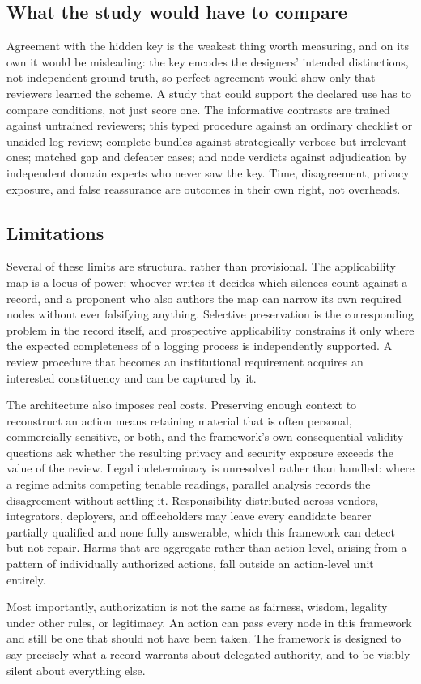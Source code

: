 \subsection{What the study would have to compare}

Agreement with the hidden key is the weakest thing worth measuring, and on its own it would be misleading: the key encodes the designers' intended distinctions, not independent ground truth, so perfect agreement would show only that reviewers learned the scheme. A study that could support the declared use has to compare conditions, not just score one. The informative contrasts are trained against untrained reviewers; this typed procedure against an ordinary checklist or unaided log review; complete bundles against strategically verbose but irrelevant ones; matched gap and defeater cases; and node verdicts against adjudication by independent domain experts who never saw the key. Time, disagreement, privacy exposure, and false reassurance are outcomes in their own right, not overheads.

\subsection{Limitations}

Several of these limits are structural rather than provisional. The applicability map is a locus of power: whoever writes it decides which silences count against a record, and a proponent who also authors the map can narrow its own required nodes without ever falsifying anything. Selective preservation is the corresponding problem in the record itself, and prospective applicability constrains it only where the expected completeness of a logging process is independently supported. A review procedure that becomes an institutional requirement acquires an interested constituency and can be captured by it.

The architecture also imposes real costs. Preserving enough context to reconstruct an action means retaining material that is often personal, commercially sensitive, or both, and the framework's own consequential-validity questions ask whether the resulting privacy and security exposure exceeds the value of the review. Legal indeterminacy is unresolved rather than handled: where a regime admits competing tenable readings, parallel analysis records the disagreement without settling it. Responsibility distributed across vendors, integrators, deployers, and officeholders may leave every candidate bearer partially qualified and none fully answerable, which this framework can detect but not repair. Harms that are aggregate rather than action-level, arising from a pattern of individually authorized actions, fall outside an action-level unit entirely.

Most importantly, authorization is not the same as fairness, wisdom, legality under other rules, or legitimacy. An action can pass every node in this framework and still be one that should not have been taken. The framework is designed to say precisely what a record warrants about delegated authority, and to be visibly silent about everything else.
